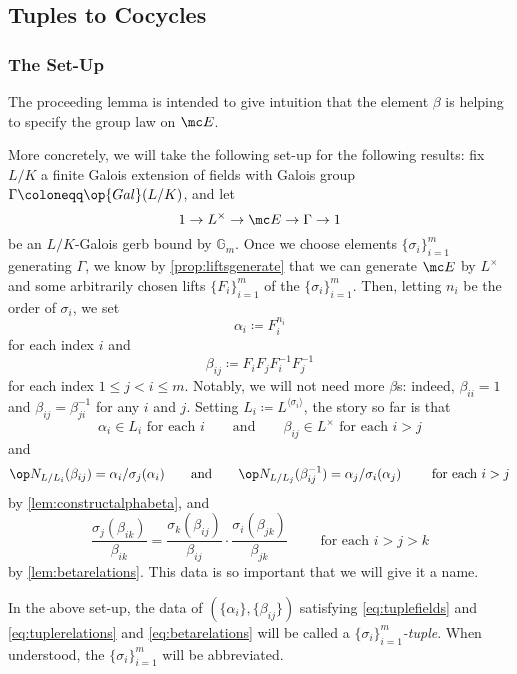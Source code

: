\documentclass{article}
\numberwithin{equation}{section}
\begin{document}
\subsection{Tuples to Cocycles}
\subsubsection{The Set-Up}
The proceeding lemma is intended to give intuition that the element $\beta$ is helping to specify the group law on $\mc E$.

More concretely, we will take the following set-up for the following results: fix $L/K$ a finite Galois extension of fields with Galois group $\Gamma\coloneqq\op{Gal}(L/K)$, and let
\[1\to L^\times\to\mc E\to\Gamma\to1\]
be an $L/K$-Galois gerb bound by $\mathbb G_m$. Once we choose elements $\{\sigma_i\}_{i=1}^m$ generating $\Gamma$, we know by \autoref{prop:liftsgenerate} that we can generate $\mc E$ by $L^\times$ and some arbitrarily chosen lifts $\{F_i\}_{i=1}^m$ of the $\{\sigma_i\}_{i=1}^m$. Then, letting $n_i$ be the order of $\sigma_i$, we set
\[\alpha_i\coloneqq F_i^{n_i}\]
for each index $i$ and
\[\beta_{ij}\coloneqq F_iF_jF_i^{-1}F_j^{-1}\]
for each index $1\le j<i\le m$. Notably, we will not need more $\beta$s: indeed, $\beta_{ii}=1$ and $\beta_{ij}=\beta_{ji}^{-1}$ for any $i$ and $j$. Setting $L_i\coloneqq L^{\langle\sigma_i\rangle}$, the story so far is that
\begin{equation}
	\alpha_i\in L_i\text{ for each }i\qquad\text{and}\qquad\beta_{ij}\in L^\times\text{ for each }i>j \label{eq:tuplefields}
\end{equation}
and
\begin{equation}
	\op N_{L/L_i}(\beta_{ij})=\alpha_i/\sigma_j(\alpha_i)\qquad\text{and}\qquad\op N_{L/L_j}(\beta_{ij}^{-1})=\alpha_j/\sigma_i(\alpha_j)\qquad\text{ for each }i>j \label{eq:tuplerelations}
\end{equation}
by \autoref{lem:constructalphabeta}, and
\begin{equation}
	\frac{\sigma_j(\beta_{ik})}{\beta_{ik}}=\frac{\sigma_k(\beta_{ij})}{\beta_{ij}}\cdot\frac{\sigma_i(\beta_{jk})}{\beta_{jk}}\qquad\text{ for each }i>j>k \label{eq:betarelations}
\end{equation}
by \autoref{lem:betarelations}. This data is so important that we will give it a name.
\begin{definition}
	In the above set-up, the data of $(\{\alpha_i\},\{\beta_{ij}\})$ satisfying \autoref{eq:tuplefields} and \autoref{eq:tuplerelations} and \autoref{eq:betarelations} will be called a \textit{$\{\sigma_i\}_{i=1}^m$-tuple}. When understood, the $\{\sigma_i\}_{i=1}^m$ will be abbreviated.
\end{definition}
\end{document}
